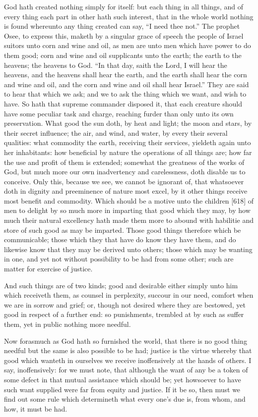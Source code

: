 God hath created nothing simply for itself: but each thing in all things, and of every thing each part in other hath such interest, that in the whole world nothing is found whereunto any thing created can say, “I need thee not.” The prophet Osee, to express this, maketh by a singular grace of speech the people of Israel suitors unto corn and wine and oil, as men are unto men which have power to do them good; corn and wine and oil supplicants unto the earth; the earth to the heavens; the heavens to God. “In that day, saith the Lord, I will hear the heavens, and the heavens shall hear the earth, and the earth shall hear the corn and wine and oil, and the corn and wine and oil shall hear Israel.” They are said to hear that which we ask; and we to ask the thing which we want, and wish to have. So hath that supreme commander disposed it, that each creature should have some peculiar task and charge, reaching furder than only unto its own preservation. What good the sun doth, by heat and light; the moon and stars, by their secret influence; the air, and wind, and water, by every their several qualities: what commodity the earth, receiving their services, yieldeth again unto her inhabitants: how beneficial by nature the operations of all things are; how far the use and profit of them is extended; somewhat the greatness of the works of God, but much more our own inadvertency and carelessness, doth disable us to conceive. Only this, because we see, we cannot be ignorant of, that whatsoever doth in dignity and preeminence of nature most excel, by it other things receive most benefit and commodity. Which should be a motive unto the children [618] of men to delight by so much more in imparting that good which they may, by how much their natural excellency hath made them more to abound with habilitie and store of such good as may be imparted. Those good things therefore which be communicable; those which they that have do know they have them, and do likewise know that they may be derived unto others; those which may be wanting in one, and yet not without possibility to be had from some other; such are matter for exercise of justice.

And such things are of two kinds; good and desirable either simply unto him which receiveth them, as counsel in perplexity, succour in our need, comfort when we are in sorrow and grief; or, though not desired where they are bestowed, yet good in respect of a further end: so punishments, trembled at by such as suffer them, yet in public nothing more needful.

Now forasmuch as God hath so furnished the world, that there is no good thing needful but the same is also possible to be had; justice is the virtue whereby that good which wanteth in ourselves we receive inoffensively at the hands of others. I say, inoffensively: for we must note, that although the want of any be a token of some defect in that mutual assistance which should be; yet howsoever to have such want supplied were far from equity and justice. If it be so, then must we find out some rule which determineth what every one’s due is, from whom, and how, it must be had.

